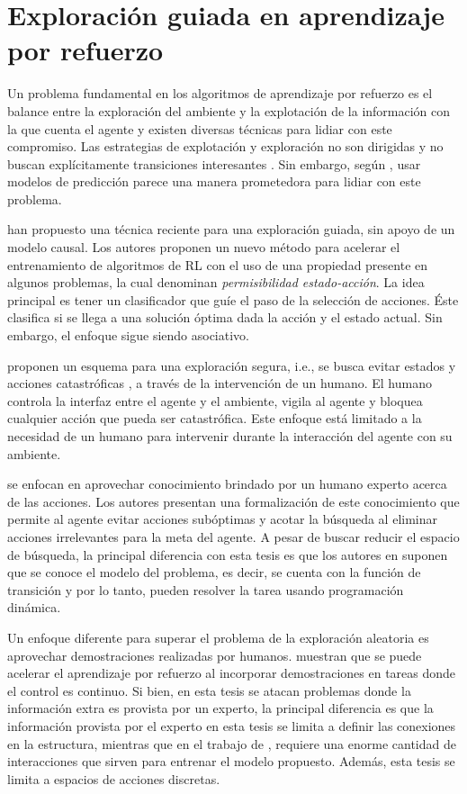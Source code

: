 \section{Exploración guiada en aprendizaje por refuerzo}

Un problema fundamental en los algoritmos de aprendizaje por refuerzo
es el balance entre la exploración del ambiente y la explotación
de la información con la que cuenta el agente y existen diversas técnicas para lidiar con este compromiso.
Las estrategias de explotación y exploración no 
son dirigidas y no buscan explícitamente transiciones
interesantes \cite{mcfarlane2018survey}.
Sin embargo, según \citet{hafner2019dream}, usar modelos de predicción parece una manera 
prometedora para lidiar con este problema.
 
\citet{mazumder2019guided} han propuesto una técnica reciente para una exploración 
guiada, sin apoyo de un modelo causal.
Los autores proponen un nuevo método
para acelerar el entrenamiento de algoritmos de RL con el uso de una propiedad presente
en algunos problemas, la cual denominan \textit{permisibilidad estado-acción}.
La idea principal es tener un clasificador
que guíe el paso de la selección de acciones. Éste clasifica si se llega
a una solución óptima dada la acción y el
estado actual. Sin embargo, el enfoque sigue siendo
asociativo.

\citet{saunders2017trial} proponen un esquema 
para una exploración segura, i.e., se busca evitar estados y acciones catastróficas \cite{Geibel01reinforcementlearning}, a través de la intervención de un humano. El humano controla la interfaz entre el agente y el ambiente, vigila
al agente y bloquea cualquier acción que pueda ser catastrófica. Este enfoque
está limitado a la necesidad de un humano para intervenir durante la interacción 
del agente con su ambiente.


\citet{Abel2015GoalBasedAP} se enfocan en aprovechar conocimiento
brindado por un humano experto acerca de las acciones. Los autores presentan
una formalización de este conocimiento que permite al agente 
evitar acciones subóptimas y acotar la búsqueda al eliminar acciones 
irrelevantes para la meta del agente. A pesar de buscar reducir el espacio 
de búsqueda, la principal diferencia con esta tesis es que
los autores en \cite{Abel2015GoalBasedAP} suponen que se conoce el modelo 
del problema, es decir, se cuenta con la función de transición y por lo tanto,
pueden resolver la tarea usando programación dinámica.


Un enfoque diferente para superar el problema de la exploración aleatoria es
aprovechar demostraciones realizadas por humanos. \citet{nair2017overcoming} muestran que se puede acelerar el aprendizaje por refuerzo al incorporar demostraciones en tareas donde el control es continuo. Si bien, en esta tesis se atacan problemas donde la información extra es provista por un experto, la principal diferencia es que la información provista por el experto en esta tesis se limita a definir las conexiones en la estructura, mientras que en el trabajo de \citet{nair2017overcoming}, requiere una enorme cantidad de interacciones que sirven para entrenar el modelo propuesto. Además, esta tesis se limita a espacios de acciones discretas.


